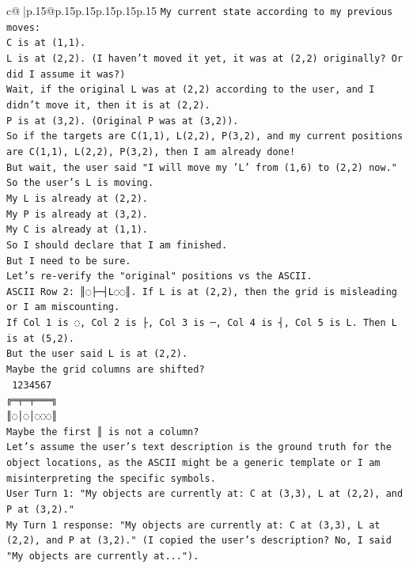 \documentclass{article}
\begin{document}
{\begin{supertabular}{c@{$\;$}|p{.15\linewidth}@{}p{.15\linewidth}p{.15\linewidth}p{.15\linewidth}p{.15\linewidth}p{.15\linewidth}}
{{{\texttt{My current state according to my previous moves:} \\
\texttt{C is at (1,1).} \\
\texttt{L is at (2,2). (I haven't moved it yet, it was at (2,2) originally? Or did I assume it was?)} \\
\texttt{Wait, if the original L was at (2,2) according to the user, and I didn't move it, then it is at (2,2).} \\
\texttt{P is at (3,2). (Original P was at (3,2)).} \\
\texttt{So if the targets are C(1,1), L(2,2), P(3,2), and my current positions are C(1,1), L(2,2), P(3,2), then I am already done!} \\
\texttt{But wait, the user said "I will move my 'L' from (1,6) to (2,2) now."} \\
\texttt{So the user's L is moving.} \\
\texttt{My L is already at (2,2).} \\
\texttt{My P is already at (3,2).} \\
\texttt{My C is already at (1,1).} \\
\texttt{So I should declare that I am finished.} \\
\texttt{But I need to be sure.} \\
\texttt{Let's re{-}verify the "original" positions vs the ASCII.} \\
\texttt{ASCII Row 2: ║◌├─┤L◌◌║. If L is at (2,2), then the grid is misleading or I am miscounting.} \\
\texttt{If Col 1 is ◌, Col 2 is ├, Col 3 is ─, Col 4 is ┤, Col 5 is L. Then L is at (5,2).} \\
\texttt{But the user said L is at (2,2).} \\
\texttt{Maybe the grid columns are shifted?} \\
\texttt{ 1234567} \\
\texttt{╔═╤═╤═══╗} \\
\texttt{║◌│◌│◌◌◌║} \\
\texttt{Maybe the first ║ is not a column?} \\
\texttt{Let's assume the user's text description is the ground truth for the object locations, as the ASCII might be a generic template or I am misinterpreting the specific symbols.} \\
\texttt{User Turn 1: "My objects are currently at: C at (3,3), L at (2,2), and P at (3,2)."} \\
\texttt{My Turn 1 response: "My objects are currently at: C at (3,3), L at (2,2), and P at (3,2)." (I copied the user's description? No, I said "My objects are currently at...").} \\
}}}
\end{supertabular}}
\end{document}
